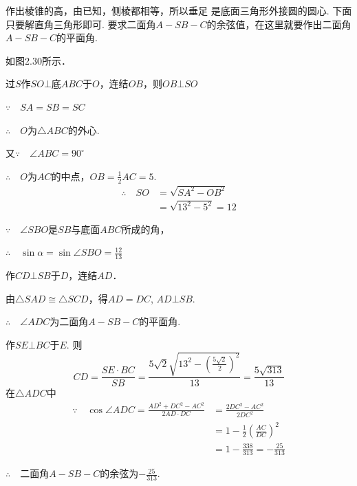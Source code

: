 \begin{analyze}
    作出棱锥的高，由已知，侧棱都相等，所以垂足
    是底面三角形外接圆的圆心. 下面只要解直角三角形即可. 要求二面角$A-SB-C$的余弦值，在这里就要作出二面角$A-SB-C$的平面角.
\end{analyze}


\begin{solution}
如图2.30所示．
\begin{enumerate}[(1)]
\noindent
\begin{minipage}{.53\textwidth}
\item 过$S$作$SO\bot $底$ABC$于$O$，连结$OB$，则$OB\bot SO$

 $\because\quad SA=SB=SC$

$\therefore\quad O$为$\triangle ABC$的外心.

又$\because\quad \angle ABC=90^{\circ}$

$\therefore\quad O$为$AC$的中点，$OB=\frac{1}{2}AC=5$.
\[\begin{split}
    \therefore\quad SO&=\sqrt{SA^2-OB^2}\\
    &=\sqrt{13^2-5^2}=12
\end{split}\]
\end{minipage}
\hfill
\begin{minipage}{.45\textwidth}
\centering
{}
\end{minipage}
   
\item $\because\quad \angle SBO$是$SB$与底面$ABC$所成的角，

$\therefore\quad \sin\alpha=\sin\angle SBO=\frac{12}{13}$

\item 作$CD\bot SB$于$D$，连结$AD$．

由$\triangle SAD\cong\triangle SCD$，得$AD=DC$, $AD\bot SB$.

$\therefore\quad \angle ADC$为二面角$A-SB-C$的平面角.

作$SE\bot BC$于$E$. 则
\[CD=\frac{SE\cdot BC}{SB}=\frac{5\sqrt{2}\sqrt{13^2-\left(\frac{5\sqrt{2}}{2}\right)^2}}{13}=\frac{5\sqrt{313}}{13}\]
在$\triangle ADC$中
\[\begin{split}
\because\quad \cos\angle ADC = \frac{AD^2+DC^2-AC^2}{2AD\cdot DC}&=\frac{2DC^2-AC^2}{2DC^2}\\
&=1-\frac{1}{2}\left(\frac{AC}{DC}\right)^2 \\
&=1-\frac{338}{313}=-\frac{25}{313}
\end{split}\]

$\therefore\quad $二面角$A-SB-C$的余弦为$-\frac{25}{313}$.
\end{enumerate}
\end{solution}

